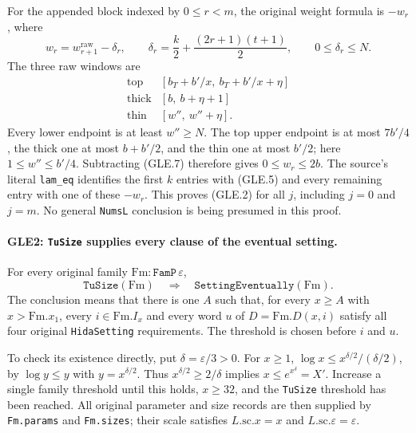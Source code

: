 For the appended block indexed by $0\le r<m$, the original weight
formula is $-w_r$, where
\[
 w_r=w_{r+1}^{\mathrm{raw}}-\delta_r,
 \qquad
 \delta_r=\frac{k}{2}+\frac{(2r+1)(t+1)}2,
 \qquad 0\le\delta_r\le N.                       \tag{GLE.7}
\]
The three raw windows are
\[
 \begin{array}{c|c}
 \text{top}&[b_T+b'/x,\ b_T+b'/x+\eta]\\
 \text{thick}&[b,\ b+\eta+1]\\
 \text{thin}&[w'',\ w''+\eta].
 \end{array}                                      \tag{GLE.8}
\]
Every lower endpoint is at least $w''\ge N$.
The top upper endpoint is at most $7b'/4$, the thick one at most
$b+b'/2$, and the thin one at most $b'/2$; here $1\le w''\le b'/4$.
Subtracting (GLE.7) therefore gives $0\le w_r\le2b$.
The source's literal \texttt{lam\_eq} identifies the first $k$ entries
with (GLE.5) and every remaining entry with one of these $-w_r$.
This proves (GLE.2) for all $j$, including $j=0$ and $j=m$.
No general \texttt{NumsL} conclusion is being presumed in this proof.

\paragraph{GLE2: \texttt{TuSize} supplies every clause of the eventual setting.}
\label{claim:GLE2}
For every original family $\mathrm{Fm}:\texttt{FamP}\,\varepsilon$,
\[
 \texttt{TuSize}(\mathrm{Fm})
 \quad\Longrightarrow\quad
 \texttt{SettingEventually}(\mathrm{Fm}).          \tag{GLE.9}
\]
The conclusion means that there is one $A$ such that, for every
$x\ge A$ with $x>\mathrm{Fm}.x_1$, every $i\in\mathrm{Fm}.I_x$ and
every word $u$ of $D=\mathrm{Fm}.D(x,i)$ satisfy all four original
\texttt{HidaSetting} requirements.  The threshold is chosen before
$i$ and $u$.

To check its existence directly, put $\delta=\varepsilon/3>0$.
For $x\ge1$, $\log x\le x^{\delta/2}/(\delta/2)$, by
$\log y\le y$ with $y=x^{\delta/2}$.
Thus $x^{\delta/2}\ge2/\delta$ implies $x\le e^{x^\delta}=X'$.
Increase a single family threshold until this holds, $x\ge32$, and
the \texttt{TuSize} threshold has been reached.  All original parameter
and size records are then supplied by \texttt{Fm.params} and
\texttt{Fm.sizes}; their scale satisfies $L.\mathrm{sc}.x=x$ and
$L.\mathrm{sc}.\varepsilon=\varepsilon$.

